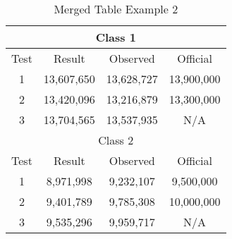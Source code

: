 \begin{table}[!htb]
    \centering
    \caption{Merged Table Example 2}\label{tab:merged-table-example-2}
    \begin{tabular}{|c|c|c|c|}
        \hline
        \multicolumn{4}{|c|}{Class 1} \\
        \hline
        Test & Result & Observed & Official \\
        \hline
        1 & 13,607,650 & 13,628,727 & 13,900,000 \\
        2 & 13,420,096 & 13,216,879 & 13,300,000 \\
        3 & 13,704,565 & 13,537,935 & N/A \\
        \hline

        \multicolumn{4}{|c|}{Class 2} \\
        \hline
        Test & Result & Observed & Official \\
        \hline
        1 & 8,971,998 & 9,232,107 & 9,500,000 \\
        2 & 9,401,789 & 9,785,308 & 10,000,000 \\
        3 & 9,535,296 & 9,959,717 & N/A \\
        \hline
    \end{tabular}
\end{table}




